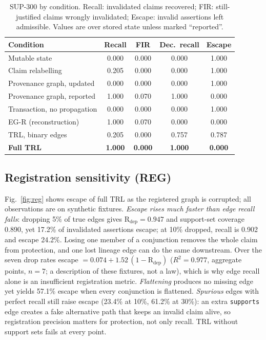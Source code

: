 \documentclass[cmc,article,submit,moreauthors,pdftex]{Definitions/tsp}
\begin{document}
\begin{table}[t]
\centering
\caption{SUP-300 by condition. Recall: invalidated claims recovered; FIR: still-justified claims wrongly invalidated; Escape: invalid assertions left admissible. Values are over stored state unless marked ``reported''.}
\label{tab:sup}
\scriptsize
\begin{tabular}{@{}lcccc@{}}
\toprule
Condition & Recall & FIR & Dec.\ recall & Escape \\
\midrule
Mutable state & 0.000 & 0.000 & 0.000 & 1.000 \\
Claim relabelling & 0.205 & 0.000 & 0.000 & 1.000 \\
Provenance graph, updated & 0.000 & 0.000 & 0.000 & 1.000 \\
Provenance graph, reported & 1.000 & 0.070 & 1.000 & 0.000 \\
Transaction, no propagation & 0.000 & 0.000 & 0.000 & 1.000 \\
EG-R (reconstruction) & 1.000 & 0.070 & 0.000 & 0.000 \\
TRL, binary edges & 0.205 & 0.000 & 0.757 & 0.787 \\
\textbf{Full TRL} & \textbf{1.000} & \textbf{0.000} & \textbf{1.000} & \textbf{0.000} \\
\bottomrule
\end{tabular}
\end{table}

\subsection{Registration sensitivity (REG)}
\label{sec:reg_results}
Fig.~\ref{fig:reg} shows escape of full TRL as the registered graph is corrupted; all observations are on synthetic fixtures. \emph{Escape rises much faster than edge recall falls}: dropping 5\% of true edges gives $\mathrm{R}_{\mathrm{dep}}=0.947$ and support-set coverage 0.890, yet 17.2\% of invalidated assertions escape; at 10\% dropped, recall is 0.902 and escape 24.2\%. Losing one member of a conjunction removes the whole claim from protection, and one lost lineage edge can do the same downstream. Over the seven drop rates escape $=0.074+1.52\,(1-\mathrm{R}_{\mathrm{dep}})$ ($R^2=0.977$, aggregate points, $n=7$; a description of these fixtures, not a law), which is why edge recall alone is an insufficient registration metric. \emph{Flattening} produces no missing edge yet yields 57.1\% escape when every conjunction is flattened. \emph{Spurious} edges with perfect recall still raise escape (23.4\% at 10\%, 61.2\% at 30\%): an extra \texttt{supports} edge creates a fake alternative path that keeps an invalid claim alive, so registration precision matters for protection, not only recall. TRL without support sets fails at every point.
\end{document}
